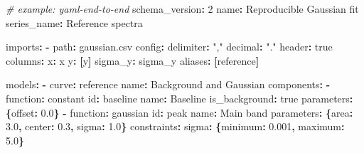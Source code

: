 \documentclass[
  10pt,
  a4paper,
  oneside]{scrreprt}
\newenvironment{Shaded}{}{}
\newcommand{\AttributeTok}[1]{\textcolor[rgb]{0.49,0.56,0.16}{#1}}
\newcommand{\CharTok}[1]{\textcolor[rgb]{0.25,0.44,0.63}{#1}}
\newcommand{\CommentTok}[1]{\textcolor[rgb]{0.38,0.63,0.69}{\textit{#1}}}
\newcommand{\DecValTok}[1]{\textcolor[rgb]{0.25,0.63,0.44}{#1}}
\newcommand{\FloatTok}[1]{\textcolor[rgb]{0.25,0.63,0.44}{#1}}
\newcommand{\FunctionTok}[1]{\textcolor[rgb]{0.02,0.16,0.49}{#1}}
\newcommand{\KeywordTok}[1]{\textcolor[rgb]{0.00,0.44,0.13}{\textbf{#1}}}
\newcommand{\StringTok}[1]{\textcolor[rgb]{0.25,0.44,0.63}{#1}}
\begin{document}
\begin{Shaded}
\begin{Highlighting}[]
\CommentTok{\# example: yaml{-}end{-}to{-}end}
\FunctionTok{schema\_version}\KeywordTok{:}\AttributeTok{ }\DecValTok{2}
\FunctionTok{name}\KeywordTok{:}\AttributeTok{ Reproducible Gaussian fit}
\FunctionTok{series\_name}\KeywordTok{:}\AttributeTok{ Reference spectra}

\FunctionTok{imports}\KeywordTok{:}
\AttributeTok{  }\KeywordTok{{-}}\AttributeTok{ }\FunctionTok{path}\KeywordTok{:}\AttributeTok{ gaussian.csv}
\AttributeTok{    }\FunctionTok{config}\KeywordTok{:}
\AttributeTok{      }\FunctionTok{delimiter}\KeywordTok{:}\AttributeTok{ }\StringTok{","}
\AttributeTok{      }\FunctionTok{decimal}\KeywordTok{:}\AttributeTok{ }\StringTok{"."}
\AttributeTok{      }\FunctionTok{header}\KeywordTok{:}\AttributeTok{ }\CharTok{true}
\AttributeTok{    }\FunctionTok{columns}\KeywordTok{:}
\AttributeTok{      }\FunctionTok{x}\KeywordTok{:}\AttributeTok{ x}
\AttributeTok{      }\FunctionTok{y}\KeywordTok{:}\AttributeTok{ }\KeywordTok{[}\CharTok{y}\KeywordTok{]}
\AttributeTok{      }\FunctionTok{sigma\_y}\KeywordTok{:}\AttributeTok{ sigma\_y}
\AttributeTok{    }\FunctionTok{aliases}\KeywordTok{:}\AttributeTok{ }\KeywordTok{[}\AttributeTok{reference}\KeywordTok{]}

\FunctionTok{models}\KeywordTok{:}
\AttributeTok{  }\KeywordTok{{-}}\AttributeTok{ }\FunctionTok{curve}\KeywordTok{:}\AttributeTok{ reference}
\AttributeTok{    }\FunctionTok{name}\KeywordTok{:}\AttributeTok{ Background and Gaussian}
\AttributeTok{    }\FunctionTok{components}\KeywordTok{:}
\AttributeTok{      }\KeywordTok{{-}}\AttributeTok{ }\FunctionTok{function}\KeywordTok{:}\AttributeTok{ constant}
\AttributeTok{        }\FunctionTok{id}\KeywordTok{:}\AttributeTok{ baseline}
\AttributeTok{        }\FunctionTok{name}\KeywordTok{:}\AttributeTok{ Baseline}
\AttributeTok{        }\FunctionTok{is\_background}\KeywordTok{:}\AttributeTok{ }\CharTok{true}
\AttributeTok{        }\FunctionTok{parameters}\KeywordTok{:}\AttributeTok{ }\KeywordTok{\{}\FunctionTok{offset}\KeywordTok{:}\AttributeTok{ }\FloatTok{0.0}\KeywordTok{\}}
\AttributeTok{      }\KeywordTok{{-}}\AttributeTok{ }\FunctionTok{function}\KeywordTok{:}\AttributeTok{ gaussian}
\AttributeTok{        }\FunctionTok{id}\KeywordTok{:}\AttributeTok{ peak}
\AttributeTok{        }\FunctionTok{name}\KeywordTok{:}\AttributeTok{ Main band}
\AttributeTok{        }\FunctionTok{parameters}\KeywordTok{:}\AttributeTok{ }\KeywordTok{\{}\FunctionTok{area}\KeywordTok{:}\AttributeTok{ }\FloatTok{3.0}\KeywordTok{,}\AttributeTok{ }\FunctionTok{center}\KeywordTok{:}\AttributeTok{ }\FloatTok{0.3}\KeywordTok{,}\AttributeTok{ }\FunctionTok{sigma}\KeywordTok{:}\AttributeTok{ }\FloatTok{1.0}\KeywordTok{\}}
\AttributeTok{        }\FunctionTok{constraints}\KeywordTok{:}
\AttributeTok{          }\FunctionTok{sigma}\KeywordTok{:}\AttributeTok{ }\KeywordTok{\{}\FunctionTok{minimum}\KeywordTok{:}\AttributeTok{ }\FloatTok{0.001}\KeywordTok{,}\AttributeTok{ }\FunctionTok{maximum}\KeywordTok{:}\AttributeTok{ }\FloatTok{5.0}\KeywordTok{\}}


\end{Highlighting}
\end{Shaded}
\end{document}
